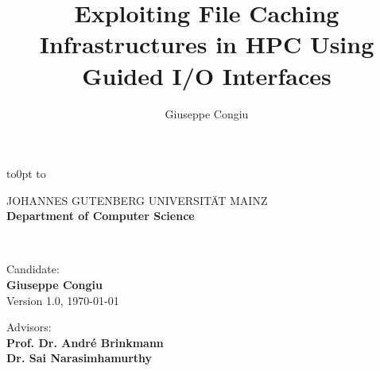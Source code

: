 \documentclass[a4paper,titlepage,oneside,10pt]{book}
\title{Exploiting File Caching Infrastructures in HPC Using Guided I/O Interfaces}
\author{Giuseppe Congiu}
\begin{document}
\hypersetup{citecolor=black,filecolor=black,linkcolor=black,urlcolor=blue} %

\begin{titlepage}
\thispagestyle{empty}

\begin{flushleft}
\vbox to0pt{
\vbox to\vss}
\end{flushleft}

\begin{center}
        \large JOHANNES GUTENBERG UNIVERSIT{\"A}T MAINZ \\
        \large \textbf{Department of Computer Science}
\end{center}

\begin{center}
	 \\
	\vspace{0.2cm}
\end{center}
\vspace{3cm}

\begin{flushright}
	Candidate:\\
	\textbf{Giuseppe Congiu}\\
	Version 1.0, \today
\end{flushright}

\begin{flushright}
	Advisors:\\
	\textbf{Prof. Dr. Andr\'e Brinkmann}\\
        \textbf{Dr. Sai Narasimhamurthy}
\end{flushright}

\end{titlepage}

\newpage
\thispagestyle{empty}
\null
\newpage
{}\setcounter{page}{1}
\tableofcontents
\mainmatter
\end{document}
